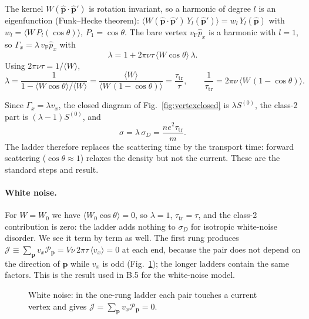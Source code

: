 The kernel $W(\hat{\mathbf p}\!\cdot\!\hat{\mathbf p}')$ is rotation
invariant, so a harmonic of degree $l$ is an eigenfunction (Funk--Hecke
theorem): $\langle W(\hat{\mathbf p}\!\cdot\!\hat{\mathbf p}')\,Y_l(\hat{\mathbf p}')\rangle
=w_l\,Y_l(\hat{\mathbf p})$ with $w_l=\langle W\,P_l(\cos\theta)\rangle$,
$P_1=\cos\theta$. The bare vertex $v_{\mathrm F}\hat p_x$ is a harmonic
with $l=1$, so $\Gamma_x=\lambda\,v_{\mathrm F}\hat p_x$ with
\[
\lambda=1+2\pi\nu\tau\,\langle W\cos\theta\rangle\,\lambda .
\]
Using $2\pi\nu\tau=1/\langle W\rangle$,
\begin{equation}
\lambda=\frac{1}{1-\langle W\cos\theta\rangle/\langle W\rangle}
=\frac{\langle W\rangle}{\langle W\,(1-\cos\theta)\rangle}
=\frac{\tau_{\mathrm{tr}}}{\tau},
\qquad
\frac1{\tau_{\mathrm{tr}}}=2\pi\nu\,\langle W\,(1-\cos\theta)\rangle .
\label{eq:lambda}
\end{equation}


Since $\Gamma_x=\lambda v_x$, the closed diagram of
Fig.~\ref{fig:vertexclosed} is $\lambda S^{(0)}$, the class-2 part is
$(\lambda-1)S^{(0)}$, and
\begin{equation}
\sigma=\lambda\,\sigma_D=\frac{ne^2\tau_{\mathrm{tr}}}{m}.
\label{eq:sigmatr}
\end{equation}
The ladder therefore replaces the scattering time by the transport
time: forward scattering ($\cos\theta\approx1$) relaxes the density but
not the current. These are the standard steps and result.

\paragraph{White noise.}
For $W=W_0$ we have $\langle W_0\cos\theta\rangle=0$, so $\lambda=1$,
$\tau_{\mathrm{tr}}=\tau$, and the class-2 contribution is zero: the
ladder adds nothing to $\sigma_D$ for isotropic white-noise disorder. We
see it term by term as well. The first rung produces
$\mathcal J\equiv\sum_{\mathbf p}v_x\mathcal P_{\mathbf p}=V\nu\,2\pi\tau\,\langle v_x\rangle=0$
at each end, because the pair does not depend on the direction of
$\mathbf p$ while $v_x$ is odd (Fig.~\ref{fig:onerung}); the longer
ladders contain the same factors. This is the result used in B.5 for the
white-noise model.

\begin{figure}[ht]
\centering
{}
\caption{White noise: in the one-rung ladder each pair touches a current
vertex and gives $\mathcal J=\sum_{\mathbf p}v_x\mathcal P_{\mathbf p}=0$.}
\label{fig:onerung}
\end{figure}

